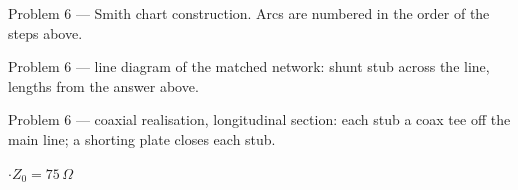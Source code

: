 {\footnotesize\color{sub} Problem 6 --- Smith chart construction. Arcs are numbered in the order of the steps above.}

{\footnotesize\color{sub} Problem 6 --- line diagram of the matched network: shunt stub across the line, lengths from the answer above.}

{\footnotesize\color{sub} Problem 6 --- coaxial realisation, longitudinal section: each stub a coax tee off the main line; a shorting plate closes each stub.}

\vspace{2pt}

{\color{sub}\footnotesize {} \gap$\cdot$\gap $Z_0 = 75\,\Omega$}

